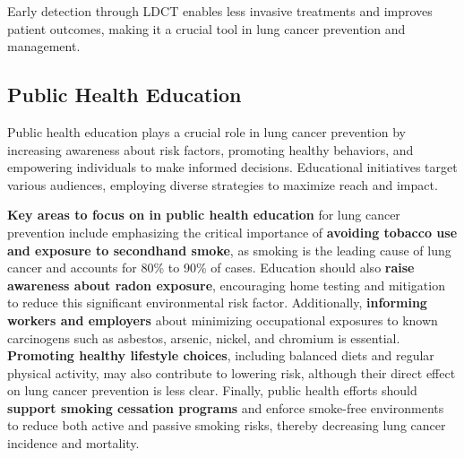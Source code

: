 Early detection through LDCT enables less invasive treatments and improves patient outcomes, making 
it a crucial tool in lung cancer prevention and management.

\subsection{Public Health Education}

Public health education plays a crucial role in lung cancer prevention by increasing awareness about 
risk factors, promoting healthy behaviors, and empowering individuals to make informed decisions. 
Educational initiatives target various audiences, employing diverse strategies to maximize reach 
and impact.

\textbf{Key areas to focus on in public health education} for lung cancer prevention include 
emphasizing the critical importance of \textbf{avoiding tobacco use and exposure to secondhand 
smoke}, as smoking is the leading cause of lung cancer and accounts for 80\% to 90\% of cases. 
Education should also \textbf{raise awareness about radon exposure}, encouraging home testing and 
mitigation to reduce this significant environmental risk factor. Additionally, \textbf{informing 
workers and employers} about minimizing occupational exposures to known carcinogens such as 
asbestos, arsenic, nickel, and chromium is essential. \textbf{Promoting healthy lifestyle choices}, 
including balanced diets and regular physical activity, may also contribute to lowering risk, 
although their direct effect on lung cancer prevention is less clear. Finally, public health efforts 
should \textbf{support smoking cessation programs} and enforce smoke-free environments to reduce 
both active and passive smoking risks, thereby decreasing lung cancer incidence and mortality. 
\cite{nci2025}

